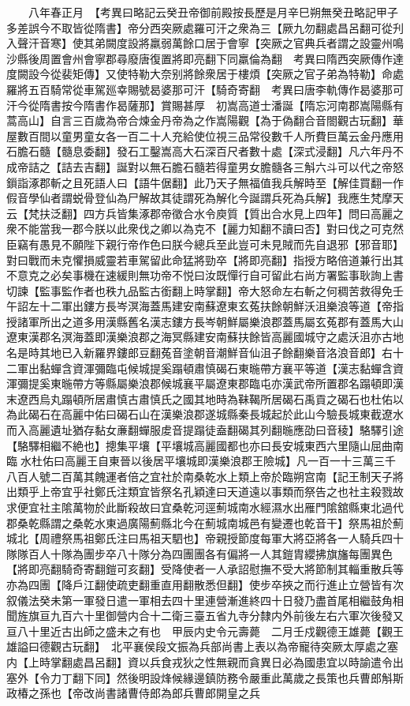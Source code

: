 　　八年春正月　【考異曰略記云癸丑帝御前殿按長歷是月辛巳朔無癸丑略記甲子多差誤今不取皆從隋書】帝分西突厥處羅可汗之衆為三【厥九勿翻處昌呂翻可從刋入聲汗音寒】使其弟闕度設將羸弱萬餘口居于會寧【突厥之官典兵者謂之設靈州鳴沙縣後周置會州會寧郡尋廢唐復置將即亮翻下同羸倫為翻　考異曰隋西突厥傳作達度闕設今從裴矩傳】又使特勒大奈别將餘衆居于樓煩【突厥之官子弟為特勒】命處羅將五百騎常從車駕廵幸賜號曷婆那可汗【騎奇寄翻　考異曰唐李軌傳作曷婆那可汗今從隋書按今隋書作曷薩那】賞賜甚厚　初嵩高道士潘誕【隋忘河南郡嵩陽縣有蒿高山】自言三百歲為帝合煉金丹帝為之作嵩陽觀【為于偽翻合音閤觀古玩翻】華屋數百間以童男童女各一百二十人充給使位視三品常役數千人所費巨萬云金丹應用石膽石髓【髓息委翻】發石工鑿嵩高大石深百尺者數十處【深式浸翻】凡六年丹不成帝詰之【詰去吉翻】誕對以無石膽石髓若得童男女膽髓各三斛六斗可以代之帝怒鎻詣涿郡斬之且死語人曰【語牛倨翻】此乃天子無福值我兵解時至【解佳買翻一作假音學仙者謂蜕骨登仙為尸解故其徒謂死為解化今誕謂兵死為兵解】我應生梵摩天云【梵扶泛翻】四方兵皆集涿郡帝徵合水令庾質【質出合水見上四年】問曰高麗之衆不能當我一郡今朕以此衆伐之卿以為克不【麗力知翻不讀曰否】對曰伐之可克然臣竊有愚見不願陛下親行帝作色曰朕今總兵至此豈可未見賊而先自退邪【邪音耶】對曰戰而未克懼損威靈若車駕留此命猛將勁卒【將即亮翻】指授方略倍道兼行出其不意克之必矣事機在速緩則無功帝不悦曰汝既憚行自可留此右尚方署監事耿詢上書切諫【監事監作者也秩九品監古銜翻上時掌翻】帝大怒命左右斬之何稠苦救得免壬午詔左十二軍出鏤方長岑溟海蓋馬建安南蘇遼東玄菟扶餘朝鮮沃沮樂浪等道【帝指授諸軍所出之道多用漢縣舊名漢志鏤方長岑朝鮮屬樂浪郡蓋馬屬玄菟郡有蓋馬大山遼東漢郡名溟海蓋即漢樂浪郡之海冥縣建安南蘇扶餘皆高麗國城守之處沃沮亦古地名是時其地已入新羅界鏤郎豆翻菟音塗朝音潮鮮音仙沮子餘翻樂音洛浪音郎】右十二軍出黏蟬含資渾彌臨屯候城提奚蹋頓肅慎碣石東暆帶方襄平等道【漢志黏蟬含資渾彌提奚東暆帶方等縣屬樂浪郡候城襄平屬遼東郡臨屯亦漢武帝所置郡名蹋頓即漢末遼西烏丸蹋頓所居肅慎古肅慎氏之國其地時為靺鞨所居碣石禹貢之碣石也杜佑以為此碣石在高麗中佑曰碣石山在漢樂浪郡遂城縣秦長城起於此山今驗長城東截遼水而入高麗遺址猶存黏女亷翻蟬服䖍音提蹋徒盍翻碣其列翻暆應劭曰音稜】駱驛引途【駱驛相繼不絶也】摠集平壤【平壤城高麗國都也亦曰長安城東西六里隨山屈曲南臨水杜佑曰高麗王自東晉以後居平壤城即漢樂浪郡王險城】凡一百一十三萬三千八百人號二百萬其餽運者倍之宜社於南桑乾水上類上帝於臨朔宫南【記王制天子將出類乎上帝宜乎社鄭氏注類宜皆祭名孔穎達曰天道遠以事類而祭告之也社主殺戮故求便宜社主隂萬物於此斷殺故曰宜桑乾河逕薊城南水經濕水出雁門隂舘縣東北過代郡桑乾縣謂之桑乾水東過廣陽薊縣北今在薊城南城邑有變遷也乾音干】祭馬祖於薊城北【周禮祭馬祖鄭氏注曰馬祖天駟也】帝親授節度每軍大將亞將各一人騎兵四十隊隊百人十隊為團步卒八十隊分為四團團各有偏將一人其鎧胄纓拂旗旛每團異色【將即亮翻騎奇寄翻鎧可亥翻】受降使者一人承詔慰撫不受大將節制其輜重散兵等亦為四團【降戶江翻使疏吏翻重直用翻散悉但翻】使步卒挾之而行進止立營皆有次叙儀法癸未第一軍發日遣一軍相去四十里連營漸進終四十日發乃盡首尾相繼鼓角相聞旌旗亘九百六十里御營内合十二衛三臺五省九寺分隸内外前後左右六軍次後發又亘八十里近古出師之盛未之有也　甲辰内史令元壽薨　二月壬戍觀德王雄薨【觀王雄謚曰德觀古玩翻】　北平襄侯段文振為兵部尚書上表以為帝寵待突厥太厚處之塞内【上時掌翻處昌呂翻】資以兵食戎狄之性無親而貪異日必為國患宜以時諭遣令出塞外【令力丁翻下同】然後明設烽候緣邊鎮防務令嚴重此萬歲之長策也兵曹郎斛斯政椿之孫也【帝改尚書諸曹侍郎為郎兵曹郎開皇之兵